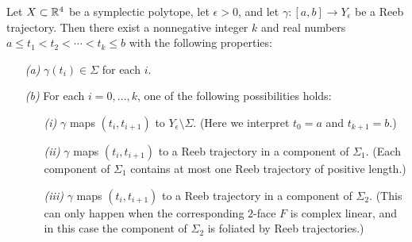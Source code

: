 \begin{lemma}
\label{lem:nsrt}
Let $X\subset{\mathbb R}^4$ be a symplectic polytope, let $\epsilon>0$, and let $\gamma:[a,b]\to Y_\epsilon$ be a Reeb trajectory. Then there exist a nonnegative integer $k$ and real numbers $a\le t_1 < t_2 < \cdots < t_k \le b$ with the following properties:
\begin{itemize}
\item[\emph{(a)}]
$\gamma(t_i)\in\Sigma$ for each $i$.
\item[\emph{(b)}]
For each $i=0,\ldots,k$, one of the following possibilities holds:
\begin{itemize}
\item[\emph{(i)}] $\gamma$ maps $(t_i,t_{i+1})$ to $Y_\epsilon\setminus\Sigma$. (Here we interpret $t_0=a$ and $t_{k+1}=b$.)
\item[\emph{(ii)}] $\gamma$ maps $(t_i,t_{i+1})$ to a Reeb trajectory in a component of $\Sigma_1$. (Each component of $\Sigma_1$ contains at most one Reeb trajectory of positive length.)
\item[\emph{(iii)}] $\gamma$ maps $(t_i,t_{i+1})$ to a Reeb trajectory in a component of $\Sigma_2$. (This can only happen when the corresponding $2$-face $F$ is complex linear, and in this case the component of $\Sigma_2$ is foliated by Reeb trajectories.)
\end{itemize}
\end{itemize}
\end{lemma}


